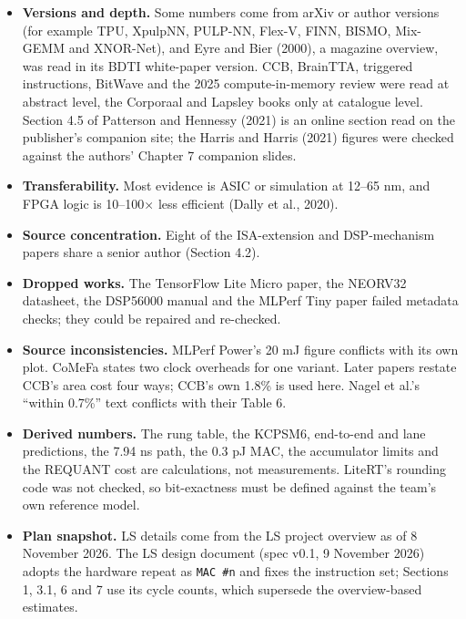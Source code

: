 \begin{itemize}
\item \textbf{Versions and depth.} Some numbers come from arXiv or author versions (for example TPU, XpulpNN, PULP-NN, Flex-V, FINN, BISMO, Mix-GEMM and XNOR-Net), and Eyre and Bier (2000), a magazine overview, was read in its BDTI white-paper version. CCB, BrainTTA, triggered instructions, BitWave and the 2025 compute-in-memory review were read at abstract level, the Corporaal and Lapsley books only at catalogue level. Section 4.5 of Patterson and Hennessy (2021) is an online section read on the publisher's companion site; the Harris and Harris (2021) figures were checked against the authors' Chapter 7 companion slides.
\item \textbf{Transferability.} Most evidence is ASIC or simulation at 12–65 nm, and FPGA logic is 10–100× less efficient (Dally et al., 2020).
\item \textbf{Source concentration.} Eight of the ISA-extension and DSP-mechanism papers share a senior author (Section 4.2).
\item \textbf{Dropped works.} The TensorFlow Lite Micro paper, the NEORV32 datasheet, the DSP56000 manual and the MLPerf Tiny paper failed metadata checks; they could be repaired and re-checked.
\item \textbf{Source inconsistencies.} MLPerf Power's 20 mJ figure conflicts with its own plot. CoMeFa states two clock overheads for one variant. Later papers restate CCB's area cost four ways; CCB's own 1.8\% is used here. Nagel et al.'s “within 0.7\%” text conflicts with their Table 6.
\item \textbf{Derived numbers.} The rung table, the KCPSM6, end-to-end and lane predictions, the 7.94 ns path, the 0.3 pJ MAC, the accumulator limits and the REQUANT cost are calculations, not measurements. LiteRT's rounding code was not checked, so bit-exactness must be defined against the team's own reference model.
\item \textbf{Plan snapshot.} LS details come from the LS project overview as of 8 November 2026. The LS design document (spec v0.1, 9 November 2026) adopts the hardware repeat as \texttt{MAC \#n} and fixes the instruction set; Sections 1, 3.1, 6 and 7 use its cycle counts, which supersede the overview-based estimates.
\end{itemize}

